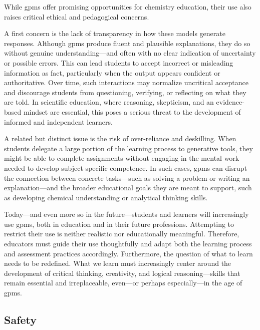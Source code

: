 While \glspl{gpm} offer promising opportunities for chemistry education, their use also raises critical ethical and pedagogical concerns.

A first concern is the lack of transparency in how these models generate responses. 
Although \glspl{gpm} produce fluent and plausible explanations, they do so without genuine understanding---and often with no clear indication of uncertainty or possible errors. 
This can lead students to accept incorrect or misleading information as fact, particularly when the output appears confident or authoritative. Over time, such interactions may normalize uncritical acceptance and discourage students from questioning, verifying, or reflecting on what they are told. 
In scientific education, where reasoning, skepticism, and an evidence-based mindset are essential, this poses a serious threat to the development of informed and independent   learners.\autocite{marcus2025will, kosmyna2025your}

A related but distinct issue is the risk of over-reliance and deskilling. When students delegate a large portion of the learning process to generative tools, they might be able to complete assignments without engaging in the mental work needed to develop subject-specific competence. 
In such cases, \glspl{gpm} can disrupt the connection between concrete tasks---such as solving a problem or writing an explanation---and the broader educational goals they are meant to support, such as developing chemical understanding or analytical thinking skills.\autocite{dung2025learning, Sharma2025role}

Today---and even more so in the future---students and learners will increasingly use \glspl{gpm}, both in education and in their future professions. 
Attempting to restrict their use is neither realistic nor educationally meaningful. 
Therefore, educators must guide their use thoughtfully and adapt both the learning process and assessment practices accordingly. 
Furthermore, the question of what to learn needs to be redefined. 
What we learn must increasingly center around the development of critical thinking, creativity, and logical reasoning---skills that remain essential and irreplaceable, even---or perhaps especially---in the age of \glspl{gpm}. \autocite{klein2025rethink}

\subsection{Safety} \label{sec:safety}

